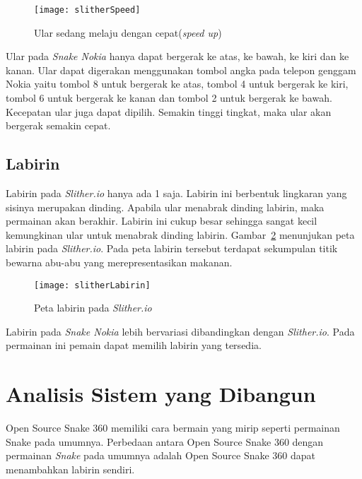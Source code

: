 \begin{figure}[H]
	\centering  
	\texttt{[image: slitherSpeed]}  
	\caption[Ular sedang melaju dengan cepat(\textit{speed up})]{Ular sedang melaju dengan cepat(\textit{speed up})}
	\label{fig:slitherSpeed} 
\end{figure}

Ular pada \textit{Snake Nokia} hanya dapat bergerak ke atas, ke bawah, ke kiri dan ke kanan. Ular dapat digerakan menggunakan tombol angka pada telepon genggam Nokia yaitu tombol 8 untuk bergerak ke atas, tombol 4 untuk bergerak ke kiri, tombol 6 untuk bergerak ke kanan dan tombol 2 untuk bergerak ke bawah. Kecepatan ular juga dapat dipilih. Semakin tinggi tingkat, maka ular akan bergerak semakin cepat.

\subsection{Labirin}
Labirin pada \textit{Slither.io} hanya ada 1 saja. Labirin ini berbentuk lingkaran yang sisinya merupakan dinding. Apabila ular menabrak dinding labirin, maka permainan akan berakhir. Labirin ini cukup besar sehingga sangat kecil kemungkinan ular untuk menabrak dinding labirin. Gambar~\ref{fig:slitherLabirin} menunjukan peta labirin pada \textit{Slither.io}. Pada peta labirin tersebut terdapat sekumpulan titik bewarna abu-abu yang merepresentasikan makanan.

\begin{figure}[H]
	\centering  
	\texttt{[image: slitherLabirin]}  
	\caption[Peta labirin pada \textit{Slither.io}]{Peta labirin pada \textit{Slither.io}}
	\label{fig:slitherLabirin} 
\end{figure}

Labirin pada \textit{Snake Nokia} lebih bervariasi dibandingkan dengan \textit{Slither.io}. Pada permainan ini pemain dapat memilih labirin yang tersedia.

\section{Analisis Sistem yang Dibangun}
Open Source Snake 360 memiliki cara bermain yang mirip seperti permainan Snake pada umumnya. Perbedaan antara Open Source Snake 360 dengan permainan \textit{Snake} pada umumnya adalah Open Source Snake 360 dapat menambahkan labirin sendiri. 

